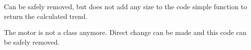 
\begin{DoxyRefList}
\item[\label{deprecated__deprecated000001}%
\hypertarget{deprecated__deprecated000001}{}%
Global \hyperlink{_l_s_r_8h_a216e7920d9eb0b0a64f082de72fce05a}{get\+Trend\+L\+S\+R} (L\+S\+R\+\_\+t $\ast$target)]Can be safely removed, but does not add any size to the code simple function to return the calculated trend. 
\item[\label{deprecated__deprecated000002}%
\hypertarget{deprecated__deprecated000002}{}%
Global \hyperlink{_motor_8h_a9156dbd3adc4b791a4abe2466a3fca43}{motor\+Set\+Rpm} (Motor\+\_\+t $\ast$target, long rmp)]The motor is not a class anymore. Direct change can be made and this code can be safely removed. 
\end{DoxyRefList}